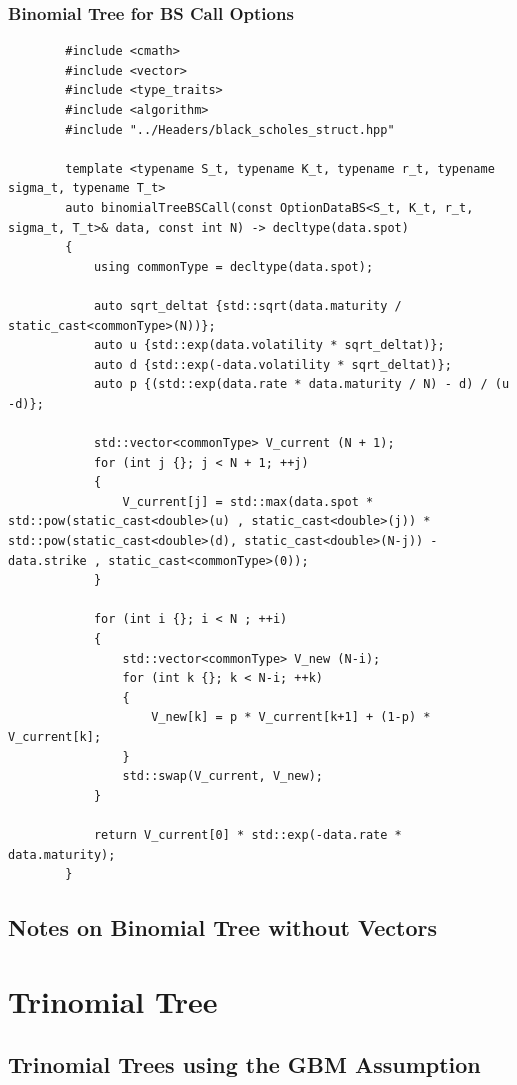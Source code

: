 \documentclass[12pt]{article}
\numberwithin{equation}{section}
\begin{document}
\subsubsection{Binomial Tree for BS Call Options}
\begin{listing}[H]
	\begin{verbatim}
		#include <cmath>
		#include <vector>
		#include <type_traits>
		#include <algorithm>
		#include "../Headers/black_scholes_struct.hpp"
		
		template <typename S_t, typename K_t, typename r_t, typename sigma_t, typename T_t>
		auto binomialTreeBSCall(const OptionDataBS<S_t, K_t, r_t, sigma_t, T_t>& data, const int N) -> decltype(data.spot)
		{
			using commonType = decltype(data.spot);
			
			auto sqrt_deltat {std::sqrt(data.maturity / static_cast<commonType>(N))};
			auto u {std::exp(data.volatility * sqrt_deltat)};
			auto d {std::exp(-data.volatility * sqrt_deltat)};
			auto p {(std::exp(data.rate * data.maturity / N) - d) / (u -d)};
			
			std::vector<commonType> V_current (N + 1);
			for (int j {}; j < N + 1; ++j)
			{
				V_current[j] = std::max(data.spot * std::pow(static_cast<double>(u) , static_cast<double>(j)) * std::pow(static_cast<double>(d), static_cast<double>(N-j)) - data.strike , static_cast<commonType>(0));
			}
			
			for (int i {}; i < N ; ++i)
			{
				std::vector<commonType> V_new (N-i);
				for (int k {}; k < N-i; ++k)
				{
					V_new[k] = p * V_current[k+1] + (1-p) * V_current[k];
				}
				std::swap(V_current, V_new);
			}   
			
			return V_current[0] * std::exp(-data.rate * data.maturity);
		}
	\end{verbatim}
	\caption{Black-Scholes-Merton Put using Monte Carlo Simulations}
	\label{lst:b76callbinomialtree}
\end{listing}
\FloatBarrier
\subsection{Notes on Binomial Tree without Vectors}
\section{Trinomial Tree}
\subsection{Trinomial Trees using the GBM Assumption}
\end{document}
